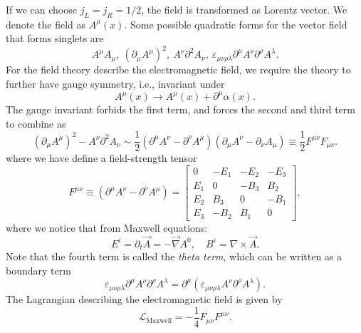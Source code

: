 If we can choose $j_L=j_R=1/2$, the field is transformed as Lorentz vector.
We denote the field as $A^\mu(x)$.
Some possible quadratic forms for the vector field that forms singlets are
\begin{equation}
	A^\mu A_\mu,\ (\partial_\mu A^\mu)^2,\ A^\nu \partial^2 A_\nu,\ 
	\varepsilon_{\mu\nu\rho\lambda} \partial^\mu A^\nu \partial^\rho A^\lambda.
\end{equation}
For the field theory describe the electromagnetic field, we require the theory to further have gauge symmetry, i.e., invariant under
\begin{equation}
	A^\mu(x) \rightarrow A^\mu(x) + \partial^\mu \alpha(x).
\end{equation}
The gauge invariant forbids the first term, and forces the second and third term to combine as
\begin{equation*}
	(\partial_\mu A^\mu)^2 - A^\nu \partial^2 A_\nu
	\sim \frac{1}{2}(\partial^\mu A^\nu - \partial^\nu A^\mu)(\partial_\mu A^\nu-\partial_\nu A_\mu)
	\equiv \frac{1}{2} F^{\mu\nu}F_{\mu\nu}.
\end{equation*}
where we have define a field-strength tensor
\begin{equation}
	F^{\mu\nu}\equiv (\partial^\mu A^\nu - \partial^\nu A^\mu)
	= \left[\begin{array}{cccc}
		0 & -E_1 & -E_2 & -E_3 \\
		E_1 & 0 & -B_3 & B_2 \\
		E_2 & B_3 & 0 & -B_1 \\
		E_3 & -B_2 & B_1 & 0
	\end{array} \right],
\end{equation}
where we notice that from Maxwell equations:
\begin{equation}
	E^i = \partial_t \vec A = -\vec\nabla A^0, \quad B^i = \nabla \times \vec A.
\end{equation}
Note that the fourth term is called the \textit{theta term}, which can be written as a boundary term
\begin{equation*}
	\varepsilon_{\mu\nu\rho\lambda} \partial^\mu A^\nu \partial^\rho A^\lambda
	= \partial^\mu (\varepsilon_{\mu\nu\rho\lambda} A^\nu \partial^\rho A^\lambda).
\end{equation*}
The Lagrangian describing the electromagnetic field is given by
\begin{equation}
	\mathcal{L}_{\mathrm{Maxwell}} = -\frac{1}{4}F_{\mu\nu}F^{\mu\nu}.
\end{equation}



